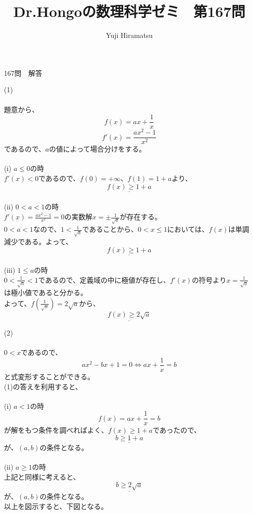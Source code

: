 \documentclass[a4j,10pt,oneside,openany]{jsbook}
\title{{\Huge \textbf{Dr.Hongoの数理科学ゼミ　第167問}}\\}
\author{Yuji Hiramatsu}
\date{}
\begin{document}
%
%
\maketitle
%
%


{\Huge 167問　解答}

\vspace{3\baselineskip}


{\Large (1)}
\\
\\
題意から、
\[ f(x)=ax+\frac{1}{x} \]
\[ f'(x)=\frac{ax^2-1}{x^2} \]
であるので、$a$の値によって場合分けをする。\\
\\
(i) $a \leq 0$の時\\
$f'(x) < 0$であるので、$f(0)=+\infty$、$f(1)=1+a$より、\\
\[ \underline{f(x) \geq 1+a} \]
\\
(ii) $0 < a < 1$の時\\
$f'(x)=\frac{ax^2-1}{x^2}=0$の実数解$x=\pm \frac{1}{\sqrt{a}}$が存在する。\\
$0 < a < 1$なので、$1<\frac{1}{\sqrt{a}}$であることから、$0 < x \leq 1$においては、$f(x)$は単調減少である。よって、\\
\[ \underline{f(x) \geq 1+a} \]
\\
(iii) $1 \leq a$の時\\
$0<\frac{1}{\sqrt{a}}<1$であるので、定義域の中に極値が存在し、$f'(x)$の符号より$x=\frac{1}{\sqrt{a}}$は極小値であると分かる。\\
よって、$f(\frac{1}{\sqrt{a}})=2\sqrt{a}$から、
\[ \underline{f(x) \geq 2 \sqrt{a}} \]

\vspace{1\baselineskip}

{\Large (2)}
\\
\\
$ 0 < x $であるので、\\
\[ a x^2 - b x + 1 = 0 \Leftrightarrow ax+\frac{1}{x}=b \]
と式変形することができる。\\
(1)の答えを利用すると、\\
\\
(i) $a < 1$の時\\
\[ f(x)=ax+\frac{1}{x}=b \]
が解をもつ条件を調べればよく、$f(x) \geq 1+a$であったので、\\
\[ \underline{b \geq 1+a}\]
が、$(a,b)$の条件となる。\\
\\
(ii) $a \geq 1$の時\\
上記と同様に考えると、
\[ \underline{b \geq 2\sqrt{a}} \]
が、$(a,b)$の条件となる。\\
以上を図示すると、下図となる。
\end{document}
